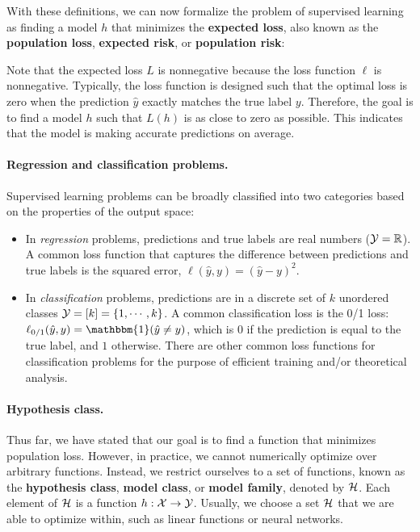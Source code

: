 With these definitions, we can now formalize the problem of supervised learning as finding a model $h$ that minimizes the \textbf{expected loss}, also known as the \textbf{population loss}, \textbf{expected risk},  or \textbf{population risk}:


Note that the expected loss $L$ is nonnegative because the loss function $\ell$ is nonnegative. 
Typically, the loss function is designed such that the optimal loss is zero when the prediction $\hat{y}$ exactly matches the true label $y$. 
Therefore, the goal is to find a model $h$ such that $L(h)$ is as close to zero as possible. 
This indicates that the model is making accurate predictions on average.

\paragraph{Regression and classification problems.}

Supervised learning problems can be broadly classified into two categories based on the properties of the output space:

\begin{itemize}
    \item In \emph{regression} problems, predictions and true labels are real numbers ($\mathcal Y = \mathbb R$). A common loss function that captures the difference between predictions and true labels is the squared error, $\ell(\hat{y}, y) = (\hat{y} - y)^2$.
    \item In \emph{classification} problems, predictions are in a discrete set of $k$ unordered classes $\mathcal Y = [k] = \{1, \cdots, k \}$. A common classification loss is the 0/1 loss: $\ell_{0/1}(\hat{y}, y) = \mathbbm{1}(\hat{y} \neq y)$, which is $0$ if the prediction is equal to the true label, and $1$ otherwise. There are other common loss functions for classification problems for the purpose of efficient training and/or theoretical analysis. 
\end{itemize}

\paragraph{Hypothesis class.}

Thus far, we have stated that our goal is to find a function that minimizes population loss. However, in practice, we cannot numerically optimize over arbitrary functions. Instead, we restrict ourselves to a set of functions, known as the \textbf{hypothesis class}, \textbf{model class}, or \textbf{model family}, denoted by $\mathcal H$. Each element of $\mathcal H$ is a function $h : \mathcal X \rightarrow \mathcal Y$. Usually, we choose a set $\mathcal H$ that we are able to optimize within, such as linear functions or neural networks.

